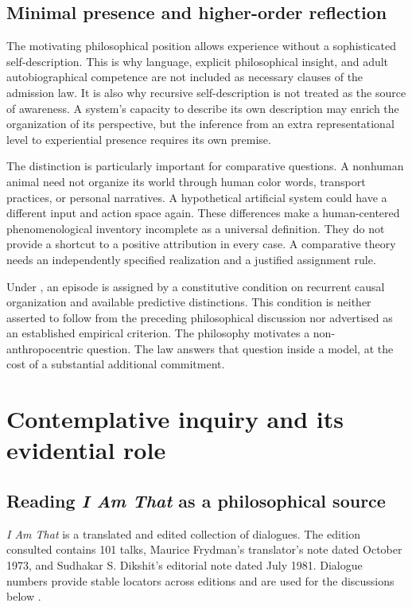 \section{Minimal presence and higher-order reflection}\label{section:distinctions:minimal-presence-and-higher-order-reflection}
The motivating philosophical position allows experience without a sophisticated self-description. This is why language, explicit philosophical insight, and adult autobiographical competence are not included as necessary clauses of the admission law. It is also why recursive self-description is not treated as the source of awareness. A system's capacity to describe its own description may enrich the organization of its perspective, but the inference from an extra representational level to experiential presence requires its own premise.

The distinction is particularly important for comparative questions. A nonhuman animal need not organize its world through human color words, transport practices, or personal narratives. A hypothetical artificial system could have a different input and action space again. These differences make a human-centered phenomenological inventory incomplete as a universal definition. They do not provide a shortcut to a positive attribution in every case. A comparative theory needs an independently specified realization and a justified assignment rule.

Under \spctwo, an episode is assigned by a constitutive condition on recurrent causal organization and available predictive distinctions. This condition is neither asserted to follow from the preceding philosophical discussion nor advertised as an established empirical criterion. The philosophy motivates a non-anthropocentric question. The law answers that question inside a model, at the cost of a substantial additional commitment.

\chapter{Contemplative inquiry and its evidential role}\label{ch:book}
\section{Reading \emph{I Am That} as a philosophical source}\label{section:book:reading-i-am-that-as-a-philosophical-source}
\emph{I Am That} is a translated and edited collection of dialogues. The edition consulted contains 101 talks, Maurice Frydman's translator's note dated October 1973, and Sudhakar S. Dikshit's editorial note dated July 1981. Dialogue numbers provide stable locators across editions and are used for the discussions below \cite{Nisargadatta}.

